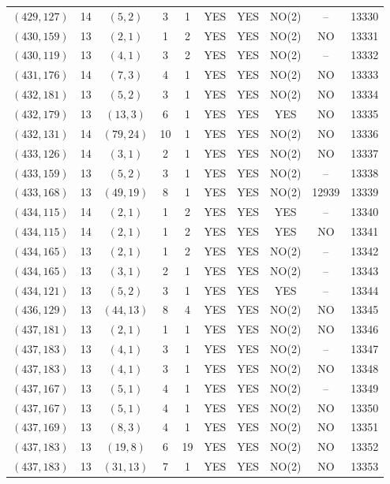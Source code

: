 \begin{longtable}{|c|c|c|c|c|c|c|c|c|c|}
$(429, 127)$ & 14 & $(5, 2)$ & 3 & 1 & YES & YES & NO(2) & -- & 13330\\
$(430, 159)$ & 13 & $(2, 1)$ & 1 & 2 & YES & YES & NO(2) & NO & 13331\\
$(430, 119)$ & 13 & $(4, 1)$ & 3 & 2 & YES & YES & NO(2) & -- & 13332\\
$(431, 176)$ & 14 & $(7, 3)$ & 4 & 1 & YES & YES & NO(2) & NO & 13333\\
$(432, 181)$ & 13 & $(5, 2)$ & 3 & 1 & YES & YES & NO(2) & NO & 13334\\
$(432, 179)$ & 13 & $(13, 3)$ & 6 & 1 & YES & YES & YES & NO & 13335\\
$(432, 131)$ & 14 & $(79, 24)$ & 10 & 1 & YES & YES & NO(2) & NO & 13336\\
$(433, 126)$ & 14 & $(3, 1)$ & 2 & 1 & YES & YES & NO(2) & NO & 13337\\
$(433, 159)$ & 13 & $(5, 2)$ & 3 & 1 & YES & YES & NO(2) & -- & 13338\\
$(433, 168)$ & 13 & $(49, 19)$ & 8 & 1 & YES & YES & NO(2) & 12939 & 13339\\
$(434, 115)$ & 14 & $(2, 1)$ & 1 & 2 & YES & YES & YES & -- & 13340\\
$(434, 115)$ & 14 & $(2, 1)$ & 1 & 2 & YES & YES & YES & NO & 13341\\
$(434, 165)$ & 13 & $(2, 1)$ & 1 & 2 & YES & YES & NO(2) & -- & 13342\\
$(434, 165)$ & 13 & $(3, 1)$ & 2 & 1 & YES & YES & NO(2) & -- & 13343\\
$(434, 121)$ & 13 & $(5, 2)$ & 3 & 1 & YES & YES & YES & -- & 13344\\
$(436, 129)$ & 13 & $(44, 13)$ & 8 & 4 & YES & YES & NO(2) & NO & 13345\\
$(437, 181)$ & 13 & $(2, 1)$ & 1 & 1 & YES & YES & NO(2) & NO & 13346\\
$(437, 183)$ & 13 & $(4, 1)$ & 3 & 1 & YES & YES & NO(2) & -- & 13347\\
$(437, 183)$ & 13 & $(4, 1)$ & 3 & 1 & YES & YES & NO(2) & NO & 13348\\
$(437, 167)$ & 13 & $(5, 1)$ & 4 & 1 & YES & YES & NO(2) & -- & 13349\\
$(437, 167)$ & 13 & $(5, 1)$ & 4 & 1 & YES & YES & NO(2) & NO & 13350\\
$(437, 169)$ & 13 & $(8, 3)$ & 4 & 1 & YES & YES & NO(2) & NO & 13351\\
$(437, 183)$ & 13 & $(19, 8)$ & 6 & 19 & YES & YES & NO(2) & NO & 13352\\
$(437, 183)$ & 13 & $(31, 13)$ & 7 & 1 & YES & YES & NO(2) & NO & 13353\\

\end{longtable}
